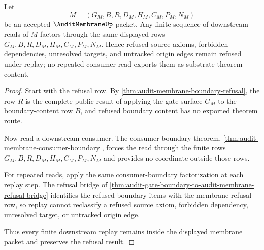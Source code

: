 \begin{theorem}
\label{thm:audit-membrane-repeated-consumer-replay-boundary}
Let
$$
M=(G_M,B,R,D_M,H_M,C_M,P_M,N_M)
$$
be an accepted $\AuditMembraneUp$ packet. Any finite sequence of downstream reads of $M$ factors through the same displayed rows $G_M,B,R,D_M,H_M,C_M,P_M,N_M$. Hence refused source axioms, forbidden dependencies, unresolved targets, and untracked origin edges remain refused under replay; no repeated consumer read exports them as substrate theorem content.
\end{theorem}
\begin{proof}
Start with the refusal row. By \autoref{thm:audit-membrane-boundary-refusal}, the row $R$ is the complete public result of applying the gate surface $G_M$ to the boundary-content row $B$, and refused boundary content has no exported theorem route.

Now read a downstream consumer. The consumer boundary theorem, \autoref{thm:audit-membrane-consumer-boundary}, forces the read through the finite rows $G_M,B,R,D_M,H_M,C_M,P_M,N_M$ and provides no coordinate outside those rows.

For repeated reads, apply the same consumer-boundary factorization at each replay step. The refusal bridge of \autoref{thm:audit-gate-boundary-to-audit-membrane-refusal-bridge} identifies the refused boundary items with the membrane refusal row, so replay cannot reclassify a refused source axiom, forbidden dependency, unresolved target, or untracked origin edge.

Thus every finite downstream replay remains inside the displayed membrane packet and preserves the refusal result.
\end{proof}
